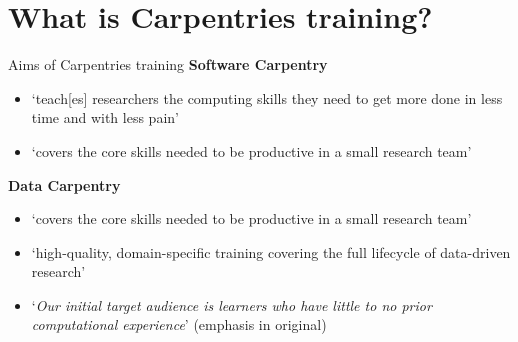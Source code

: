 \documentclass[aspectratio=169, 11pt]{beamer} %
\begin{document}

\section{What is Carpentries training?}

\begin{frame}{Aims of Carpentries training}
  \textbf{Software Carpentry} \cite{The_Carpentries2019-ej}
  \begin{itemize}[label=\textbullet]
    \item `teach[es] researchers the computing skills they need to get more done in less time and with less pain'
    \item `covers the core skills needed to be productive in a small research team'
  \end{itemize}
  \textbf{Data Carpentry} \cite{The_Carpentries2019-aa}
  \begin{itemize}
    \item `covers the core skills needed to be productive in a small research team'
    \item `high-quality, domain-specific training covering the full lifecycle of data-driven research'
    \item `\textit{Our initial target audience is learners who have little to no prior computational experience}' (emphasis in original)
  \end{itemize}
\end{frame}
\end{document}
